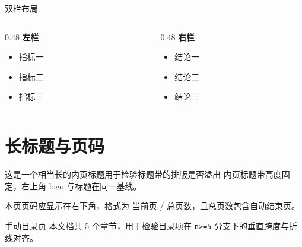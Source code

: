 \begin{frame}{双栏布局}
  \begin{columns}[T]
    \begin{column}{0.48\textwidth}
      \textbf{左栏}
      \begin{itemize}
        \item 指标一
        \item 指标二
        \item 指标三
      \end{itemize}
    \end{column}
    \begin{column}{0.48\textwidth}
      \textbf{右栏}
      \begin{itemize}
        \item 结论一
        \item 结论二
        \item 结论三
      \end{itemize}
    \end{column}
  \end{columns}
\end{frame}

\section{长标题与页码}

\begin{frame}{这是一个相当长的内页标题用于检验标题带的排版是否溢出}
  内页标题带高度固定，右上角 logo 与标题在同一基线。

  \vspace{0.4cm}
  本页页码应显示在右下角，格式为 当前页 / 总页数，且总页数包含自动结束页。
\end{frame}

\begin{frame}{手动目录页}
  本文档共 5 个章节，用于检验目录项在 \texttt{n>=5} 分支下的垂直跨度与折线对齐。
\end{frame}


